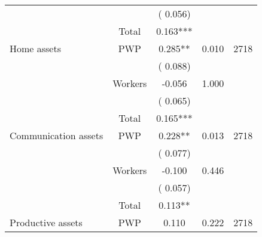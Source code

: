\begin{tabular}{l*{4}{c}}
                               &                               &       (       0.056)                     & &                                                                             \\ 
\cmidrule{2-3}
                               &       Total           &              0.163***                 &    &                                               \\ 
\cmidrule{2-3}
 Home assets                 &       PWP     &              0.285**               &       0.010    & 2718                              \\ 
                               &                               &       (       0.088)                     & &                                                                             \\ 
                               &       Workers         &             -0.056               &        1.000   &                                               \\ 
                               &                               &       (       0.065)                     & &                                                                             \\ 
\cmidrule{2-3}
                               &       Total           &              0.165***                 &    &                                               \\ 
\cmidrule{2-3}
 Communication assets                 &       PWP     &              0.228**               &        0.013   & 2718                              \\ 
                               &                               &       (       0.077)                     & &                                                                             \\ 
                               &       Workers         &             -0.100               &        0.446   &                                               \\ 
                               &                               &       (       0.057)                     & &                                                                             \\ 
\cmidrule{2-3}
                               &       Total           &              0.113**                 &    &                                               \\ 
\cmidrule{2-3}
 Productive assets                 &       PWP     &              0.110               &        0.222   & 2718                              \\ 

\end{tabular}

